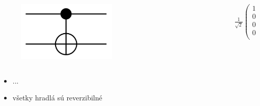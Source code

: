 \documentclass{beamer}
\begin{document}
\begin{frame}
\begin{columns}[t]
\begin{column}{.5\textwidth}
			\begin{columns}[c]
												
				\begin{column}{.5\textwidth}
					\begin{figure}
						\includegraphics[width=0.5\textwidth]{cnot_gate.png}
					\end{figure}
				\end{column}
				\begin{column}{.5\textwidth}
					$\frac{1}{\sqrt{2}}\begin{pmatrix}
					1 & 0 & 0 & 0\\
					0 & 1 & 0 & 0\\
					0 & 0 & 0 & 1\\
					0 & 0 & 1 & 0\\
					\end{pmatrix}$
				\end{column}
									
			\end{columns}
			\begin{itemize}
				\item ...
				\item všetky hradlá sú reverzibilné
				      				      
			\end{itemize}
		\end{column}
	\end{columns}      
\end{frame}
\end{document}
